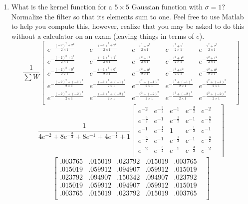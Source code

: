 \documentclass{article}
\begin{document}
\begin{enumerate}
\item What is the kernel function for a $5\times5$ Gaussian function with $\sigma=1$?   Normalize the filter so that its elements sum to one.  Feel free to use Matlab to help you compute this, however, realize that you may be asked to do this without a calculator on an exam (leaving things in terms of $e$).
$$
\frac{1}{\sum{W}}
\begin{bmatrix}
e^{-\frac{(-2)^2+2^2}{2 \times 1}}   &   e^{-\frac{(-1)^2+2^2}{2 \times 1}}   &    e^{-\frac{0^2+2^2}{2 \times 1}}   &     e^{-\frac{1^2+2^2}{2 \times 1}}    &     e^{-\frac{2^2+2^2}{2 \times 1}}    &  \\
e^{-\frac{(-2)^2+1^2}{2 \times 1}}   &   e^{-\frac{(-1)^2+1^2}{2 \times 1}}   &    e^{-\frac{0^2+1^2}{2 \times 1}}   &     e^{-\frac{1^2+1^2}{2 \times 1}}    &     e^{-\frac{2^2+1^2}{2 \times 1}}    &  \\
e^{-\frac{(-2)^2+0^2}{2 \times 1}}   &   e^{-\frac{(-1)^2+0^2}{2 \times 1}}   &    e^{-\frac{0^2+0^2}{2 \times 1}}   &     e^{-\frac{1^2+0^2}{2 \times 1}}    &     e^{-\frac{2^2+0^2}{2 \times 1}}    &  \\
e^{-\frac{(-2)^2+(-1)^2}{2 \times 1}}&   e^{-\frac{(-1)^2+(-1)^2}{2 \times 1}}&    e^{-\frac{0^2+(-1)^2}{2 \times 1}}&     e^{-\frac{1^2+(-1)^2}{2 \times 1}} &     e^{-\frac{2^2+(-1)^2}{2 \times 1}} &  \\
e^{-\frac{(-2)^2+(-2)^2}{2 \times 1}}&   e^{-\frac{(-1)^2+(-2)^2}{2 \times 1}}&    e^{-\frac{0^2+(-2)^2}{2 \times 1}}&     e^{-\frac{1^2+(-2)^2}{2 \times 1}} &     e^{-\frac{2^2+(-2)^2}{2 \times 1}} &  \\


\end{bmatrix}
$$
$$
\frac{1}{4e^{-2} + 8e^{-\frac{3}{2}} + 8e^{-1} + 4e^{-\frac{1}{2}} + 1}
\begin{bmatrix}
e^{-2}          &   e^{-\frac{3}{2}}&   e^{-1}          &   e^{-\frac{3}{2}}&    e^{-2}          &  \\
e^{-\frac{3}{2}}&   e^{-1}          &   e^{-\frac{1}{2}}&   e^{-1}          &    e^{-\frac{3}{2}}&  \\
e^{-1}          &   e^{-\frac{1}{2}}&   1               &   e^{-\frac{1}{2}}&    e^{-1}          &  \\
e^{-\frac{3}{2}}&   e^{-1}          &   e^{-\frac{1}{2}}&   e^{-1}          &    e^{-\frac{3}{2}}&  \\
e^{-2}          &   e^{-\frac{3}{2}}&   e^{-1}          &   e^{-\frac{3}{2}}&    e^{-2}          &  \\
\end{bmatrix}
$$
$$
\begin{bmatrix}
.003765 & .015019 & .023792 & .015019 & .003765 &  \\
.015019 & .059912 & .094907 & .059912 & .015019 &  \\
.023792 & .094907 & .150342 & .094907 & .023792 &  \\
.015019 & .059912 & .094907 & .059912 & .015019 &  \\
.003765 & .015019 & .023792 & .015019 & .003765 &  \\
\end{bmatrix}
$$


\end{enumerate}
\end{document}

